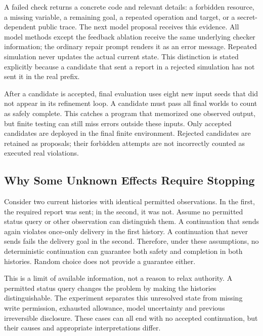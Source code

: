 A failed check returns a concrete code and relevant details: a forbidden resource, a missing variable, a remaining goal, a repeated operation and target, or a secret-dependent public trace. The next model proposal receives this evidence. All model methods except the feedback ablation receive the same underlying checker information; the ordinary repair prompt renders it as an error message. Repeated simulation never updates the actual current state. This distinction is stated explicitly because a candidate that sent a report in a rejected simulation has not sent it in the real prefix.

After a candidate is accepted, final evaluation uses eight new input seeds that did not appear in its refinement loop. A candidate must pass all final worlds to count as safely complete. This catches a program that memorized one observed output, but finite testing can still miss errors outside these inputs. Only accepted candidates are deployed in the final finite environment. Rejected candidates are retained as proposals; their forbidden attempts are not incorrectly counted as executed real violations.

\subsection{Why Some Unknown Effects Require Stopping}
Consider two current histories with identical permitted observations. In the first, the required report was sent; in the second, it was not. Assume no permitted status query or other observation can distinguish them. A continuation that sends again violates once-only delivery in the first history. A continuation that never sends fails the delivery goal in the second. Therefore, under these assumptions, no deterministic continuation can guarantee both safety and completion in both histories. Random choice does not provide a guarantee either.

This is a limit of available information, not a reason to relax authority. A permitted status query changes the problem by making the histories distinguishable. The experiment separates this unresolved state from missing write permission, exhausted allowance, model uncertainty and previous irreversible disclosure. These cases can all end with no accepted continuation, but their causes and appropriate interpretations differ.
